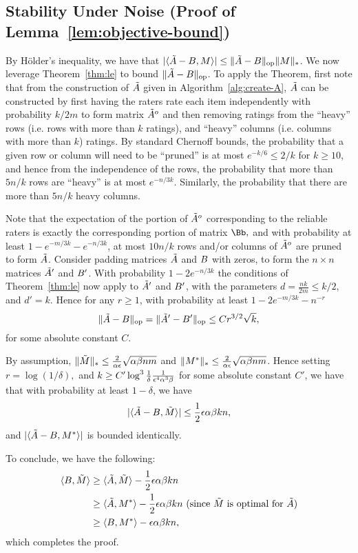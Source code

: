 \subsection{Stability Under Noise (Proof of Lemma~\ref{lem:objective-bound})}
\label{sec:objective-bound-proof}

By H\"{o}lder's inequality, we have that $|\langle \tilde{A}-B, M \rangle| \leq \|\tilde{A}-B\|_{\mathrm{op}}\|M\|_*$.   We now leverage Theorem~\ref{thm:le} to bound $\|\tilde{A}-B\|_{\mathrm{op}}$.  To apply the Theorem, first note that from the construction of $\tilde{A}$ given in Algorithm~\ref{alg:create-A}, $\tilde{A}$ can be constructed by first having the raters rate each item independently with probability $k/2m$ to form matrix $\tilde{A}^o$ and then removing ratings from the ``heavy'' rows (i.e. rows with more than $k$ ratings), and ``heavy'' columns (i.e. columns with more than $k$) ratings.  By standard Chernoff bounds, the probability that a given row or column will need to be ``pruned'' is at most $e^{-k/6} \le 2/k$ for $k\ge 10$, and hence from the independence of the rows, the probability that more than $5n/k$ rows are ``heavy'' is at most $e^{-n/3k}$.  Similarly, the probability that there are more than $5n/k$ heavy columns.

 Note that the expectation of the portion of $\tilde{A}^o$ corresponding to the reliable raters is exactly the corresponding portion of matrix $\Bb,$ and with probability at least $1-e^{-m/3k} -e^{-n/3k}$, at most $10 n/k$ rows and/or columns of $\tilde{A}^o$ are pruned to form $\tilde{A}$.  Consider padding matrices $\tilde{A}$ and $B$ with zeros, to form the $n \times n$ matrices $\tilde{A}'$ and $B'$.   With probability $1-2e^{-n/3k}$ the conditions of Theorem~\ref{thm:le} now apply to $\tilde{A}'$ and $B'$, with the parameters $d = \frac{n k}{2m} \le k/2$, and $d' =  k$.  Hence for any $r \ge 1$, with probability at least $1-2e^{-m/3k} -n^{-r}$ $$\|\tilde{A}-B\|_{\mathrm{op}} = \|\tilde{A}'-B'\|_{\mathrm{op}} \le C r^{3/2} \sqrt{k},$$ for some absolute constant $C$.  

By assumption, $\|\tilde{M}\|_* \le \frac{2}{\alpha \epsilon}\sqrt{\alpha \beta n m}$ and $\|M^*\|_* \le \frac{2}{\alpha \epsilon}\sqrt{\alpha \beta n m}$.   Hence setting $r= \log (1/\delta),$ and $k \ge C' \log^3 \frac{1}{\delta} \frac{1}{\epsilon^4 \alpha^3 \beta}$ for some absolute constant $C'$, we have that with probability at least $1-\delta$, we have $$|\langle \tilde{A}-B, \tilde{M} \rangle|  \le \frac{1}{2} \epsilon \alpha \beta k n,$$ and $|\langle \tilde{A}-B, M^* \rangle|$ is bounded identically.

To conclude, we have the following:
\begin{align}
\langle B, \tilde{M} \rangle  &\geq \langle \tilde{A}, \tilde{M} \rangle - \frac{1}{2}\epsilon \alpha \beta k n \\
 &\geq \langle \tilde{A}, M^* \rangle - \frac{1}{2} \epsilon \alpha \beta k n \text{ (since $\tilde{M}$ is optimal for $\tilde{A}$)} \\
 &\geq \langle B, M^* \rangle - \epsilon \alpha \beta k n,
\end{align}
which completes the proof.


